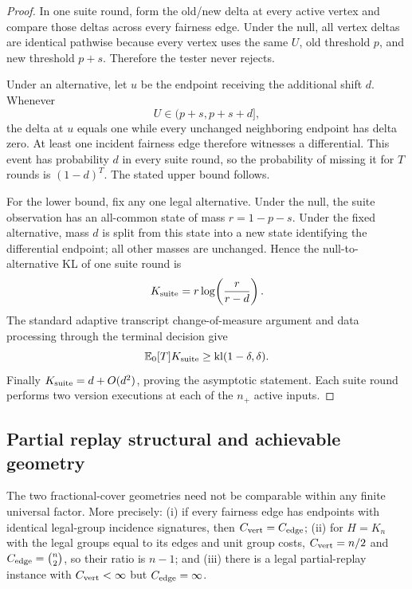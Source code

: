 \begin{proof}
In one suite round, form the old/new delta at every active vertex and compare
those deltas across every fairness edge.  Under the null, all vertex deltas are
identical pathwise because every vertex uses the same \(U\), old threshold
\(p\), and new threshold \(p+s\).  Therefore the tester never rejects.

Under an alternative, let \(u\) be the endpoint receiving the additional shift
\(d\).  Whenever
\begin{equation}\label{eq:formal-results-044}
U\in(p+s,p+s+d],
\end{equation}
the delta at \(u\) equals one while every unchanged neighboring endpoint has
delta zero.  At least one incident fairness edge therefore witnesses a
differential.  This event has probability \(d\) in every suite round, so the
probability of missing it for \(T\) rounds is \((1-d)^T\).  The stated upper
bound follows.

For the lower bound, fix any one legal alternative.  Under the null, the suite
observation has an all-common state of mass \(r=1-p-s\).  Under the fixed
alternative, mass \(d\) is split from this state into a new state identifying the
differential endpoint; all other masses are unchanged.  Hence the
null-to-alternative KL of one suite round is
\begin{equation}\label{eq:formal-results-045}
K_{\rm suite}
=
r\log\!\left(\frac{r}{r-d}\right).
\end{equation}
The standard adaptive transcript change-of-measure argument and data processing
through the terminal decision give
\begin{equation}\label{eq:formal-results-046}
\mathbb{E}_0[T]K_{\rm suite}
\ge
\mathrm{kl}(1-\delta,\delta).
\end{equation}
Finally \(K_{\rm suite}=d+O(d^2)\), proving the asymptotic statement.  Each suite
round performs two version executions at each of the \(n_+\) active inputs.
\end{proof}


\subsection{Partial replay structural and achievable geometry}


\begin{proposition}
\label{prop:p17-geometry-separation}
The two fractional-cover geometries need not be comparable within any finite
universal factor.  More precisely: (i) if every fairness edge has endpoints
with identical legal-group incidence signatures, then
$C_{\rm vert}=C_{\rm edge}$; (ii) for $H=K_n$ with the legal groups equal to
its edges and unit group costs,
$C_{\rm vert}=n/2$ and $C_{\rm edge}=\binom n2$, so their ratio is $n-1$;
and (iii) there is a legal partial-replay instance with
$C_{\rm vert}<\infty$ but $C_{\rm edge}=\infty$.
\end{proposition}

